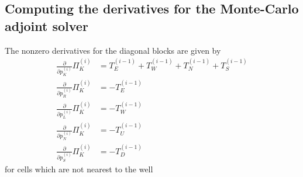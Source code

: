 \documentclass[twoside]{IEEEtran}
\newcommand*{\pdiff}[2]{\ensuremath{\frac{\partial}{\partial{#2}}{#1}}}
\begin{document}
\newpage
\appendix

\subsection{Computing the derivatives for the Monte-Carlo adjoint solver}
\label{quantitiesNeeded}

The nonzero derivatives for the diagonal blocks are given by
\begin{align}
\pdiff{\Pi_K^{(i)}}{p_K^{(i)}} &= T_E^{(i-1)} + T_W^{(i-1)} + T_N^{(i-1)} + T_S^{(i-1)} \\
\pdiff{\Pi_K^{(i)}}{p_R^{(i)}} &= -T_E^{(i-1)} \\
\pdiff{\Pi_K^{(i)}}{p_L^{(i)}} &= -T_W^{(i-1)} \\
\pdiff{\Pi_K^{(i)}}{p_N^{(i)}} &= -T_U^{(i-1)} \\
\pdiff{\Pi_K^{(i)}}{p_S^{(i)}} &= -T_D^{(i-1)}
\end{align}
for cells which are not nearest to the well
\end{document}
